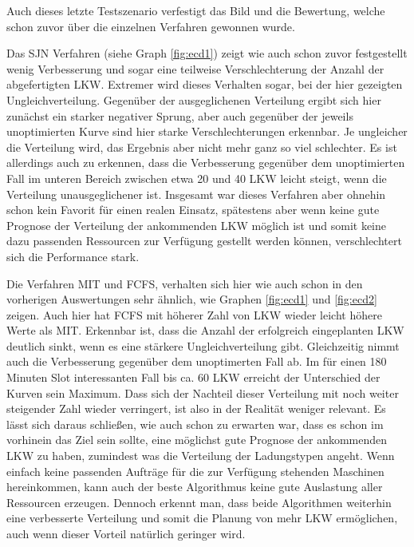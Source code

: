 
Auch dieses letzte Testszenario verfestigt das Bild und die Bewertung, welche schon zuvor über die einzelnen Verfahren gewonnen wurde. 

Das SJN Verfahren (siehe Graph \ref{fig:ecd1}) zeigt wie auch schon zuvor festgestellt wenig Verbesserung und sogar eine teilweise Verschlechterung der Anzahl der abgefertigten LKW. Extremer wird dieses Verhalten sogar, bei der hier gezeigten Ungleichverteilung. Gegenüber der ausgeglichenen Verteilung ergibt sich hier zunächst ein starker negativer Sprung, aber auch gegenüber der jeweils unoptimierten Kurve sind hier starke Verschlechterungen erkennbar. Je ungleicher die Verteilung wird, das Ergebnis aber nicht mehr ganz so viel schlechter. Es ist allerdings auch zu erkennen, dass die Verbesserung gegenüber dem unoptimierten Fall im unteren Bereich zwischen etwa 20 und 40 LKW leicht steigt, wenn die Verteilung unausgeglichener ist. Insgesamt war dieses Verfahren aber ohnehin schon kein Favorit für einen realen Einsatz, spätestens aber wenn keine gute Prognose der Verteilung der ankommenden LKW möglich ist und somit keine dazu passenden Ressourcen zur Verfügung gestellt werden können, verschlechtert sich die Performance stark.

Die Verfahren MIT und FCFS, verhalten sich hier wie auch schon in den vorherigen Auswertungen sehr ähnlich, wie Graphen \ref{fig:ecd1} und \ref{fig:ecd2} zeigen. Auch hier hat FCFS mit höherer Zahl von LKW wieder leicht höhere Werte als MIT. Erkennbar ist, dass die Anzahl der erfolgreich eingeplanten LKW deutlich sinkt, wenn es eine stärkere Ungleichverteilung gibt. Gleichzeitig nimmt auch die Verbesserung gegenüber dem unoptimerten Fall ab. Im für einen 180 Minuten Slot interessanten Fall bis ca. 60 LKW erreicht der Unterschied der Kurven sein Maximum. Dass sich der Nachteil dieser Verteilung mit noch weiter steigender Zahl wieder verringert, ist also in der Realität weniger relevant. Es lässt sich daraus schließen, wie auch schon zu erwarten war, dass es schon im vorhinein das Ziel sein sollte, eine möglichst gute Prognose der ankommenden LKW zu haben, zumindest was die Verteilung der Ladungstypen angeht. Wenn einfach keine passenden Aufträge für die zur Verfügung stehenden Maschinen hereinkommen, kann auch der beste Algorithmus keine gute Auslastung aller Ressourcen erzeugen. Dennoch erkennt man, dass beide Algorithmen weiterhin eine verbesserte Verteilung und somit die Planung von mehr LKW ermöglichen, auch wenn dieser Vorteil natürlich geringer wird.